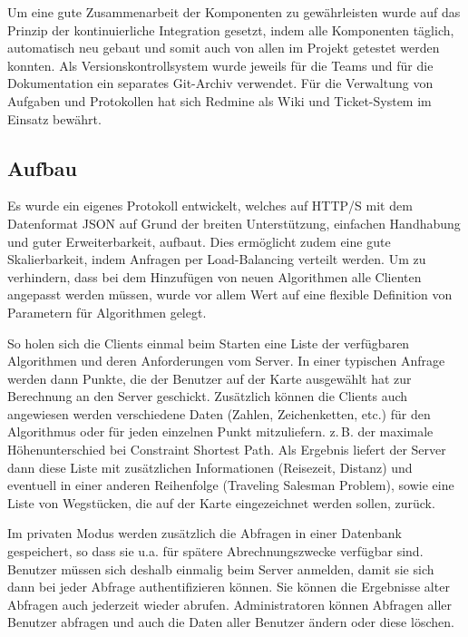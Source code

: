 Um eine gute Zusammenarbeit der Komponenten zu gewährleisten wurde auf das Prinzip der kontinuierliche Integration gesetzt, indem alle Komponenten täglich, automatisch neu gebaut und somit auch von allen im Projekt getestet werden konnten.
Als Versionskontrollsystem wurde jeweils für die Teams und für die Dokumentation ein separates Git-Archiv verwendet. Für die Verwaltung von Aufgaben und Protokollen hat sich Redmine als Wiki und Ticket-System im Einsatz bewährt.

\subsection*{Aufbau}
Es wurde ein eigenes Protokoll entwickelt, welches auf \mbox{HTTP/S} mit dem Datenformat JSON auf Grund der breiten Unterstützung, einfachen Handhabung und guter Erweiterbarkeit, aufbaut.
Dies ermöglicht zudem eine gute Skalierbarkeit, indem Anfragen per Load-Balancing verteilt werden.
Um zu verhindern, dass bei dem Hinzufügen von neuen Algorithmen alle Clienten angepasst werden müssen, wurde vor allem Wert auf eine flexible Definition von Parametern für Algorithmen gelegt.

So holen sich die Clients einmal beim Starten eine Liste der verfügbaren Algorithmen und deren Anforderungen vom Server. In einer typischen Anfrage werden dann Punkte, die der Benutzer auf der Karte ausgewählt hat zur Berechnung an den Server geschickt. Zusätzlich können die Clients auch angewiesen werden verschiedene Daten (Zahlen, Zeichenketten, etc.) für den Algorithmus oder für jeden einzelnen Punkt mitzuliefern. z.\,B. der maximale Höhenunterschied bei Constraint Shortest Path. Als Ergebnis liefert der Server dann diese Liste mit zusätzlichen Informationen (Reisezeit, Distanz) und eventuell in einer anderen Reihenfolge (Traveling Salesman Problem), sowie eine Liste von Wegstücken, die auf der Karte eingezeichnet werden sollen, zurück.

Im privaten Modus werden zusätzlich die Abfragen in einer Datenbank gespeichert, so dass sie u.a. für spätere Abrechnungszwecke verfügbar sind. Benutzer müssen sich deshalb einmalig beim Server anmelden, damit sie sich dann bei jeder Abfrage authentifizieren können. Sie können die Ergebnisse alter Abfragen auch jederzeit wieder abrufen. Administratoren können Abfragen aller Benutzer abfragen und auch die Daten aller Benutzer ändern oder diese löschen. 	